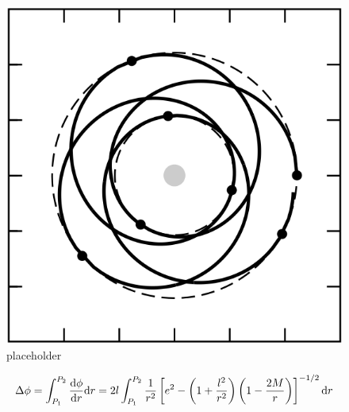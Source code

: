 \begin{figure}[h]
    \centering
    \includegraphics[width = 0.5 \textwidth]{Figures/precession_bozza.png}
    \caption{placeholder}
    \label{cap1:fig:precession}
\end{figure}

\begin{equation}
    \Delta \phi = \int_{P_1}^{P_2} \dv{\phi}{r} \mathrm{d}r
    = 2 l \int_{P_1}^{P_2} \frac{1}{r^2}
    \left[e^2 - \left(1 + \frac{l^2}{r^2}\right)
    \left(1 - \frac{2M}{r}\right)\right]^{-1/2} \mathrm{d}r
\end{equation}


